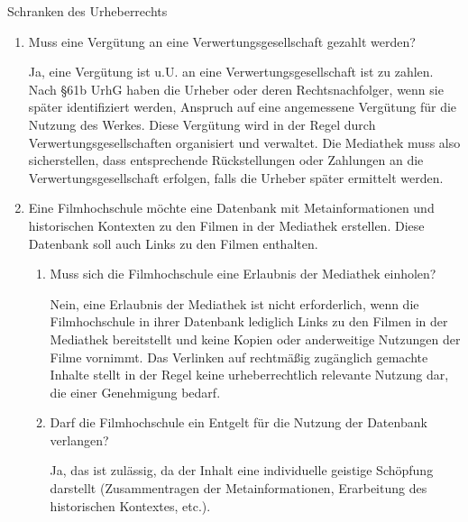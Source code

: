\documentclass{article}
\begin{document}
\begin{exercise}{Schranken des Urheberrechts}
\begin{enumerate}
    \item Muss eine Vergütung an eine Verwertungsgesellschaft gezahlt werden?

          \begin{solution}
            Ja, eine Vergütung ist u.U. an eine Verwertungsgesellschaft ist zu zahlen. Nach §61b UrhG haben die Urheber oder deren Rechtsnachfolger, wenn sie später identifiziert werden, Anspruch auf eine angemessene Vergütung für die Nutzung des Werkes. Diese Vergütung wird in der Regel durch Verwertungsgesellschaften organisiert und verwaltet. Die Mediathek muss also sicherstellen, dass entsprechende Rückstellungen oder Zahlungen an die Verwertungsgesellschaft erfolgen, falls die Urheber später ermittelt werden.
          \end{solution}

    \item Eine Filmhochschule möchte eine Datenbank mit Metainformationen und historischen Kontexten zu den Filmen in der Mediathek erstellen. Diese Datenbank soll auch Links zu den Filmen enthalten.
          \begin{enumerate}
            \item Muss sich die Filmhochschule eine Erlaubnis der Mediathek einholen?

                  \begin{solution}
                    Nein, eine Erlaubnis der Mediathek ist nicht erforderlich, wenn die Filmhochschule in ihrer Datenbank lediglich Links zu den Filmen in der Mediathek bereitstellt und keine Kopien oder anderweitige Nutzungen der Filme vornimmt. Das Verlinken auf rechtmäßig zugänglich gemachte Inhalte stellt in der Regel keine urheberrechtlich relevante Nutzung dar, die einer Genehmigung bedarf.
                  \end{solution}

            \item Darf die Filmhochschule ein Entgelt für die Nutzung der Datenbank verlangen?

                  \begin{solution}
                    Ja, das ist zulässig, da der Inhalt eine individuelle geistige Schöpfung darstellt (Zusammentragen der Metainformationen, Erarbeitung des historischen Kontextes, etc.).
                  \end{solution}
          \end{enumerate}
  \end{enumerate}
\end{exercise}
\end{document}
